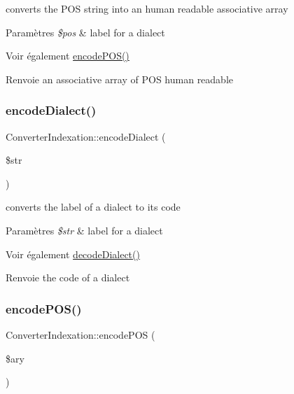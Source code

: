 converts the P\+OS string into an human readable associative array 


\begin{DoxyParams}{Paramètres}
{\em \$pos} & label for a dialect \\
\hline
\end{DoxyParams}
\begin{DoxySeeAlso}{Voir également}
\hyperlink{classConverterIndexation_a8b52ecc585f7423456ae6aaf5df2436f}{encode\+P\+O\+S()} 
\end{DoxySeeAlso}
\begin{DoxyReturn}{Renvoie}
an associative array of P\+OS human readable 
\end{DoxyReturn}
\hypertarget{classConverterIndexation_ab9501f7ab3dad7daa338023522f03949}{}\label{classConverterIndexation_ab9501f7ab3dad7daa338023522f03949} 
\subsubsection{\texorpdfstring{encode\+Dialect()}{encodeDialect()}}
{\footnotesize\ttfamily Converter\+Indexation\+::encode\+Dialect (\begin{DoxyParamCaption}\item[{}]{\$str }\end{DoxyParamCaption})}



converts the label of a dialect to its code 


\begin{DoxyParams}{Paramètres}
{\em \$str} & label for a dialect \\
\hline
\end{DoxyParams}
\begin{DoxySeeAlso}{Voir également}
\hyperlink{classConverterIndexation_a138e9e08f03d5a14fc53d367c9c739de}{decode\+Dialect()} 
\end{DoxySeeAlso}
\begin{DoxyReturn}{Renvoie}
the code of a dialect 
\end{DoxyReturn}
\hypertarget{classConverterIndexation_a8b52ecc585f7423456ae6aaf5df2436f}{}\label{classConverterIndexation_a8b52ecc585f7423456ae6aaf5df2436f} 
\subsubsection{\texorpdfstring{encode\+P\+O\+S()}{encodePOS()}}
{\footnotesize\ttfamily Converter\+Indexation\+::encode\+P\+OS (\begin{DoxyParamCaption}\item[{}]{\$ary }\end{DoxyParamCaption})}



